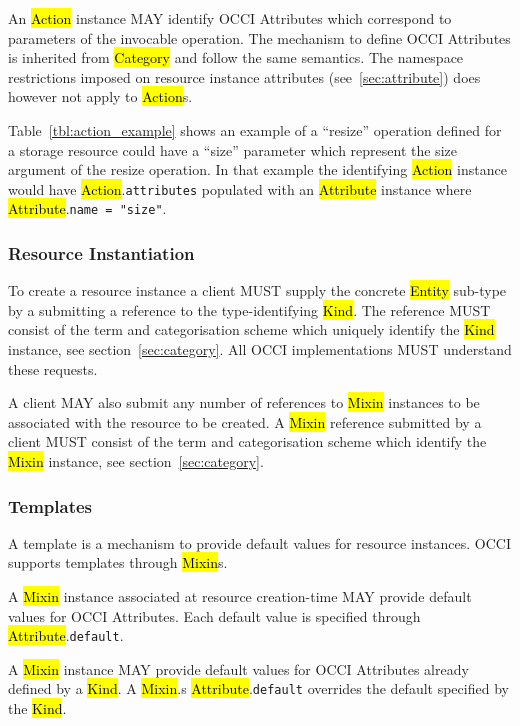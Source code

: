 \documentclass[10pt,a4paper]{article}
\begin{document}
An \hl{Action} instance MAY identify OCCI Attributes which correspond to
parameters of the invocable operation.
The mechanism to define OCCI Attributes is inherited from \hl{Category}
and follow the same semantics.
The namespace restrictions imposed on resource instance attributes
(see~\ref{sec:attribute}) does however not apply to \hl{Action}s.

Table~\ref{tbl:action_example} shows an example of a ``resize'' operation
defined for a storage
resource could have a ``size'' parameter which represent the size
argument of the resize operation. In that example the identifying
\hl{Action} instance would have \hl{Action}.{\tt attributes} populated
with an \hl{Attribute} instance where \hl{Attribute}.{\tt name = "size"}.


\subsubsection{Resource Instantiation}
\label{sec:instantiation}
To create a resource instance a client MUST supply the concrete
\hl{Entity} sub-type by a submitting a reference to the
type-identifying \hl{Kind}.  The reference MUST consist of the term
and categorisation scheme which uniquely identify the \hl{Kind}
instance, see section~\ref{sec:category}.  All OCCI implementations
MUST understand these requests.

A client MAY also submit any number of references to \hl{Mixin}
instances to be associated with the resource to be created. A
\hl{Mixin} reference submitted by a client MUST consist of the term
and categorisation scheme which identify the \hl{Mixin} instance, see
section~\ref{sec:category}.

\subsubsection{Templates}
\label{sec:template}

A template is a mechanism to provide default values for resource instances.
OCCI supports templates through \hl{Mixin}s.

A \hl{Mixin} instance associated at resource creation-time MAY provide default
values for OCCI Attributes.
Each default value is specified through \hl{Attribute}.{\tt default}.

A \hl{Mixin} instance MAY provide default values for OCCI Attributes already
defined by a \hl{Kind}. A \hl{Mixin}.s \hl{Attribute}.{\tt default} overrides
the default specified by the \hl{Kind}.
\end{document}
